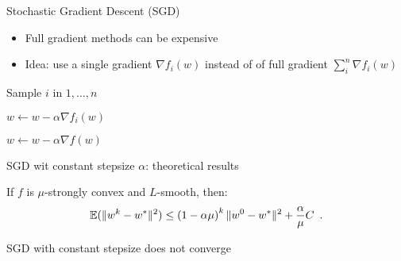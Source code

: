 \begin{frame}{Stochastic Gradient Descent (SGD)}
    \begin{itemize}
        \item Full gradient methods can be expensive
        \item \alert{Idea:} use a \alert{single gradient} $\nabla f_i(w)$ \alert{instead of of full gradient} $\sum_i^n \nabla f_i (w)$
    \end{itemize}
    \vspace{2em}
\begin{minipage}{0.49 \textwidth}
    \begin{algorithm}[H]
        \caption{SGD}
                {
                Sample $i$ in $1, \dots, n$


                $w \leftarrow w - \alpha \nabla f_i (w)$

                }
    \end{algorithm}
\end{minipage}
%
\begin{minipage}{0.49 \textwidth}
    \begin{algorithm}[H]
        \caption{GD}
                {

                    $w \leftarrow w - \alpha \nabla f (w)$
                }
    \end{algorithm}
\end{minipage}
\end{frame}

\begin{frame}{SGD wit constant stepsize $\alpha$: theoretical results}
    \begin{proposition}
        If $f$ is $\mu$-strongly convex and $L$-smooth, then:
        \[
        \mathbb{E} ( \lVert {w^{k} - w^*} \rVert^2 )
        \leq
        \left (
            1 - \alpha \mu
        \right)^k
        \lVert {w^0 - w^*} \rVert^2
        +
        \frac{\alpha}{\mu} C
        \enspace .
        \]
    \end{proposition}
    \begin{center}
        \alert{
            SGD with constant stepsize does not converge}
    \end{center}

\end{frame}

